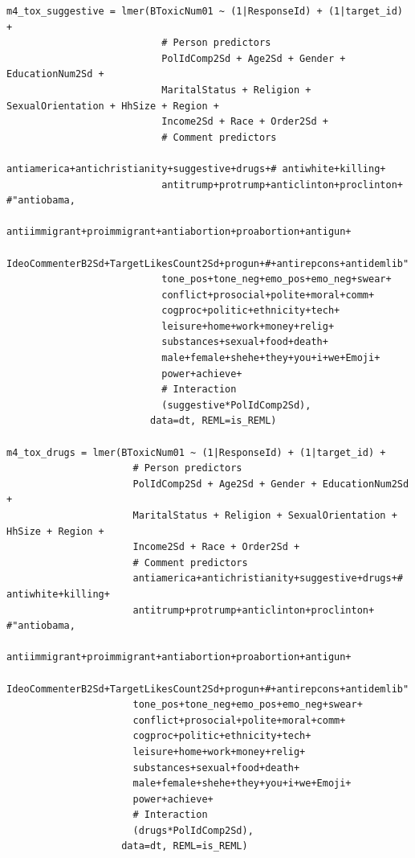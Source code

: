 \documentclass{article}
\begin{document}
\begin{lstlisting}
m4_tox_suggestive = lmer(BToxicNum01 ~ (1|ResponseId) + (1|target_id) + 
                           # Person predictors
                           PolIdComp2Sd + Age2Sd + Gender + EducationNum2Sd + 
                           MaritalStatus + Religion + SexualOrientation + HhSize + Region + 
                           Income2Sd + Race + Order2Sd + 
                           # Comment predictors  
                           antiamerica+antichristianity+suggestive+drugs+# antiwhite+killing+
                           antitrump+protrump+anticlinton+proclinton+ #"antiobama,
                           antiimmigrant+proimmigrant+antiabortion+proabortion+antigun+
                           IdeoCommenterB2Sd+TargetLikesCount2Sd+progun+#+antirepcons+antidemlib"
                           tone_pos+tone_neg+emo_pos+emo_neg+swear+
                           conflict+prosocial+polite+moral+comm+
                           cogproc+politic+ethnicity+tech+
                           leisure+home+work+money+relig+  
                           substances+sexual+food+death+    
                           male+female+shehe+they+you+i+we+Emoji+
                           power+achieve+
                           # Interaction
                           (suggestive*PolIdComp2Sd),
                         data=dt, REML=is_REML)

m4_tox_drugs = lmer(BToxicNum01 ~ (1|ResponseId) + (1|target_id) + 
                      # Person predictors
                      PolIdComp2Sd + Age2Sd + Gender + EducationNum2Sd + 
                      MaritalStatus + Religion + SexualOrientation + HhSize + Region + 
                      Income2Sd + Race + Order2Sd + 
                      # Comment predictors  
                      antiamerica+antichristianity+suggestive+drugs+# antiwhite+killing+
                      antitrump+protrump+anticlinton+proclinton+ #"antiobama,
                      antiimmigrant+proimmigrant+antiabortion+proabortion+antigun+
                      IdeoCommenterB2Sd+TargetLikesCount2Sd+progun+#+antirepcons+antidemlib"
                      tone_pos+tone_neg+emo_pos+emo_neg+swear+
                      conflict+prosocial+polite+moral+comm+
                      cogproc+politic+ethnicity+tech+
                      leisure+home+work+money+relig+  
                      substances+sexual+food+death+    
                      male+female+shehe+they+you+i+we+Emoji+
                      power+achieve+
                      # Interaction
                      (drugs*PolIdComp2Sd),
                    data=dt, REML=is_REML)


\end{lstlisting}
\end{document}

